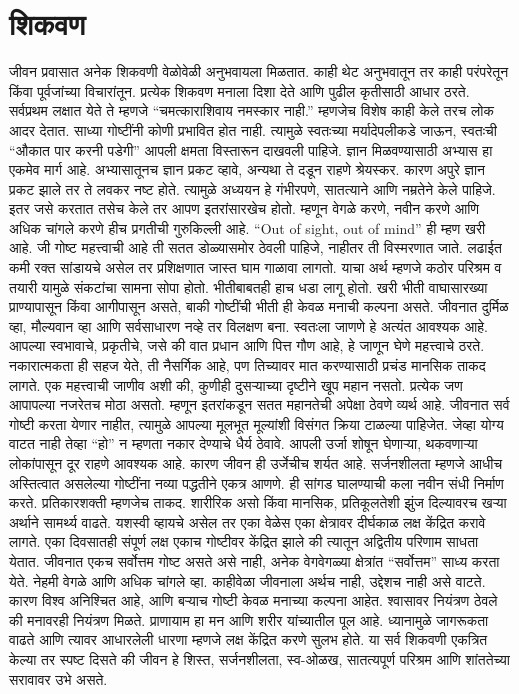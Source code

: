 \section*{शिकवण}
जीवन प्रवासात अनेक शिकवणी वेळोवेळी अनुभवायला मिळतात. काही थेट अनुभवातून तर काही परंपरेतून किंवा पूर्वजांच्या विचारांतून. प्रत्येक शिकवण मनाला दिशा देते आणि पुढील कृतीसाठी आधार ठरते.
सर्वप्रथम लक्षात येते ते म्हणजे “चमत्काराशिवाय नमस्कार नाही.” म्हणजेच विशेष काही केले तरच लोक आदर देतात. साध्या गोष्टींनी कोणी प्रभावित होत नाही. त्यामुळे स्वतःच्या मर्यादेपलीकडे जाऊन, स्वतःची “औकात पार करनी पडेगी”  आपली क्षमता विस्तारून दाखवली पाहिजे.
ज्ञान मिळवण्यासाठी अभ्यास हा एकमेव मार्ग आहे. अभ्यासातूनच ज्ञान प्रकट व्हावे, अन्यथा ते दडून राहणे श्रेयस्कर. कारण अपुरे ज्ञान प्रकट झाले तर ते लवकर नष्ट होते. त्यामुळे अध्ययन हे गंभीरपणे, सातत्याने आणि नम्रतेने केले पाहिजे.
इतर जसे करतात तसेच केले तर आपण इतरांसारखेच होतो. म्हणून वेगळे करणे, नवीन करणे आणि अधिक चांगले करणे हीच प्रगतीची गुरुकिल्ली आहे. “Out of sight, out of mind” ही म्हण खरी आहे. जी गोष्ट महत्त्वाची आहे ती सतत डोळ्यासमोर ठेवली पाहिजे, नाहीतर ती विस्मरणात जाते.
लढाईत कमी रक्त सांडायचे असेल तर प्रशिक्षणात जास्त घाम गाळावा लागतो. याचा अर्थ म्हणजे कठोर परिश्रम व तयारी यामुळे संकटांचा सामना सोपा होतो. भीतीबाबतही हाच धडा लागू होतो. खरी भीती वाघासारख्या प्राण्यापासून किंवा आगीपासून असते, बाकी गोष्टींची भीती ही केवळ मनाची कल्पना असते.
जीवनात दुर्मिळ व्हा, मौल्यवान व्हा आणि सर्वसाधारण नव्हे तर विलक्षण बना. स्वतःला जाणणे हे अत्यंत आवश्यक आहे. आपल्या स्वभावाचे, प्रकृतीचे, जसे की वात प्रधान आणि पित्त गौण आहे, हे जाणून घेणे महत्त्वाचे ठरते. नकारात्मकता ही सहज येते, ती नैसर्गिक आहे, पण तिच्यावर मात करण्यासाठी प्रचंड मानसिक ताकद लागते.
एक महत्त्वाची जाणीव अशी की, कुणीही दुसऱ्याच्या दृष्टीने खूप महान नसतो. प्रत्येक जण आपापल्या नजरेतच मोठा असतो. म्हणून इतरांकडून सतत महानतेची अपेक्षा ठेवणे व्यर्थ आहे. जीवनात सर्व गोष्टी करता येणार नाहीत, त्यामुळे आपल्या मूलभूत मूल्यांशी विसंगत क्रिया टाळल्या पाहिजेत. जेव्हा योग्य वाटत नाही तेव्हा “हो” न म्हणता नकार देण्याचे धैर्य ठेवावे.
आपली उर्जा शोषून घेणाऱ्या, थकवणाऱ्या लोकांपासून दूर राहणे आवश्यक आहे. कारण जीवन ही उर्जेचीच शर्यत आहे. सर्जनशीलता म्हणजे आधीच अस्तित्वात असलेल्या गोष्टींना नव्या पद्धतीने एकत्र आणणे. ही सांगड घालण्याची कला नवीन संधी निर्माण करते. प्रतिकारशक्ती म्हणजेच ताकद. शारीरिक असो किंवा मानसिक, प्रतिकूलतेशी झुंज दिल्यावरच खऱ्या अर्थाने सामर्थ्य वाढते.
यशस्वी व्हायचे असेल तर एका वेळेस एका क्षेत्रावर दीर्घकाळ लक्ष केंद्रित करावे लागते. एका दिवसातही संपूर्ण लक्ष एकाच गोष्टीवर केंद्रित झाले की त्यातून अद्वितीय परिणाम साधता येतात. जीवनात एकच सर्वोत्तम गोष्ट असते असे नाही, अनेक वेगवेगळ्या क्षेत्रांत “सर्वोत्तम” साध्य करता येते.
नेहमी वेगळे आणि अधिक चांगले व्हा. काहीवेळा जीवनाला अर्थच नाही, उद्देशच नाही असे वाटते. कारण विश्व अनिश्चित आहे, आणि बर्‍याच गोष्टी केवळ मनाच्या कल्पना आहेत. श्वासावर नियंत्रण ठेवले की मनावरही नियंत्रण मिळते. प्राणायाम हा मन आणि शरीर यांच्यातील पूल आहे. ध्यानामुळे जागरूकता वाढते आणि त्यावर आधारलेली धारणा म्हणजे लक्ष केंद्रित करणे सुलभ होते.
या सर्व शिकवणी एकत्रित केल्या तर स्पष्ट दिसते की जीवन हे शिस्त, सर्जनशीलता, स्व-ओळख, सातत्यपूर्ण परिश्रम आणि शांततेच्या सरावावर उभे असते.
